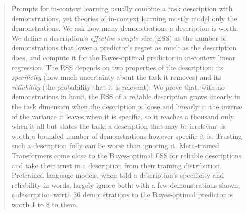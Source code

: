 \documentclass{article}
\begin{document}
\raggedbottom

\printAffiliationsAndNotice{}

\begin{abstract}
Prompts for in-context learning usually combine a task description with demonstrations, yet theories of in-context learning mostly model only the demonstrations. We ask how many demonstrations a description is worth. We define a description's \emph{effective sample size} (ESS) as the number of demonstrations that lower a predictor's regret as much as the description does, and compute it for the Bayes-optimal predictor in in-context linear regression. The ESS depends on two properties of the description: its \emph{specificity} (how much uncertainty about the task it removes) and its \emph{reliability} (the probability that it is relevant). We prove that, with no demonstrations in hand, the ESS of a reliable description grows linearly in the task dimension when the description is loose and linearly in the inverse of the variance it leaves when it is specific, so it reaches a thousand only when it all but states the task; a description that may be irrelevant is worth a bounded number of demonstrations however specific it is. Trusting such a description fully can be worse than ignoring it. Meta-trained Transformers come close to the Bayes-optimal ESS for reliable descriptions and take their trust in a description from their training distribution. Pretrained language models, when told a description's specificity and reliability in words, largely ignore both: with a few demonstrations shown, a description worth 36 demonstrations to the Bayes-optimal predictor is worth 1 to 8 to them.
\end{abstract}
\end{document}
